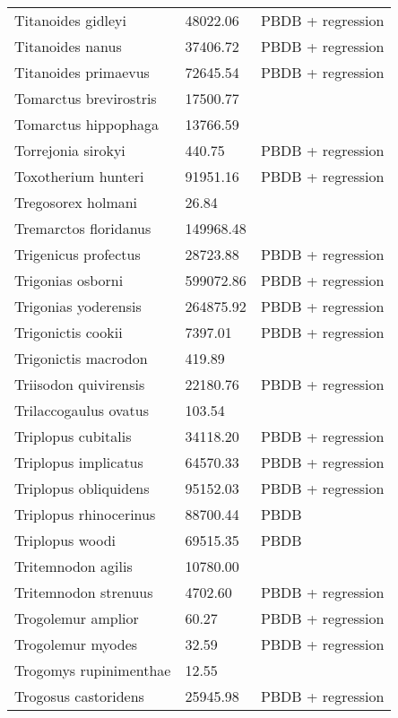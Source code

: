\documentclass{article}
\begin{document}
\begin{center}
\begin{longtable}{p{} p{} p{}}
    Titanoides gidleyi & 48022.06 & PBDB + regression \\ 
    Titanoides nanus & 37406.72 & PBDB + regression \\ 
    Titanoides primaevus & 72645.54 & PBDB + regression \\ 
    Tomarctus brevirostris & 17500.77 & \cite{Tomiya2013} \\ 
    Tomarctus hippophaga & 13766.59 & \cite{Tomiya2013} \\ 
    Torrejonia sirokyi & 440.75 & PBDB + regression \\ 
    Toxotherium hunteri & 91951.16 & PBDB + regression \\ 
    Tregosorex holmani & 26.84 & \cite{Tomiya2013} \\ 
    Tremarctos floridanus & 149968.48 & \cite{Smith2004} \\ 
    Trigenicus profectus & 28723.88 & PBDB + regression \\ 
    Trigonias osborni & 599072.86 & PBDB + regression \\ 
    Trigonias yoderensis & 264875.92 & PBDB + regression \\ 
    Trigonictis cookii & 7397.01 & PBDB + regression \\ 
    Trigonictis macrodon & 419.89 & \cite{Tomiya2013} \\ 
    Triisodon quivirensis & 22180.76 & PBDB + regression \\ 
    Trilaccogaulus ovatus & 103.54 & \cite{Tomiya2013} \\ 
    Triplopus cubitalis & 34118.20 & PBDB + regression \\ 
    Triplopus implicatus & 64570.33 & PBDB + regression \\ 
    Triplopus obliquidens & 95152.03 & PBDB + regression \\ 
    Triplopus rhinocerinus & 88700.44 & PBDB \\ 
    Triplopus woodi & 69515.35 & PBDB \\ 
    Tritemnodon agilis & 10780.00 & \cite{Egi2001} \\ 
    Tritemnodon strenuus & 4702.60 & PBDB + regression \\ 
    Trogolemur amplior & 60.27 & PBDB + regression \\ 
    Trogolemur myodes & 32.59 & PBDB + regression \\ 
    Trogomys rupinimenthae & 12.55 & \cite{Tomiya2013} \\ 
    Trogosus castoridens & 25945.98 & PBDB + regression \\ 

\end{longtable}
\end{center}
\end{document}
